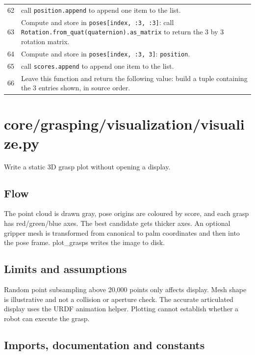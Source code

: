 \documentclass[11pt,a4paper]{book}
\begin{document}
\begin{longtable}{r p{}}
62 & call \texttt{position.append} to append one item to the list. \\

63 & Compute and store in \texttt{poses[index, :3, :3]}: call \texttt{Rotation.from\_quat(quaternion).as\_matrix} to return the 3 by 3 rotation matrix.  \\

64 & Compute and store in \texttt{poses[index, :3, 3]}: \texttt{position}.  \\

65 & call \texttt{scores.append} to append one item to the list. \\

66 & Leave this function and return the following value: build a tuple containing the 3 entries shown, in source order. \\

\end{longtable}

\chapter{core/grasping/visualization/visualize.py}

Write a static 3D grasp plot without opening a display.

\section*{Flow}

The point cloud is drawn gray, pose origins are coloured by score, and each grasp has red/green/blue axes. The best candidate gets thicker axes. An optional gripper mesh is transformed from canonical to palm coordinates and then into the pose frame. plot\_grasps writes the image to disk.

\section*{Limits and assumptions}

Random point subsampling above 20,000 points only affects display. Mesh shape is illustrative and not a collision or aperture check. The accurate articulated display uses the URDF animation helper. Plotting cannot establish whether a robot can execute the grasp.

\section{Imports, documentation and constants}
\end{document}
